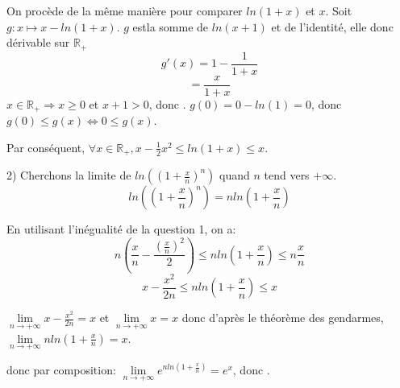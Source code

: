 \documentclass[11pt, letterpaper]{article}
\begin{document}
On procède de la même manière pour comparer $ln(1 + x)$ et $x$.
Soit $g : x \mapsto x - ln(1 + x)$.
$g$ estla somme de $ln(x +1)$ et de l'identité, elle donc dérivable sur $\mathbb{R}_{+}$
\[g'(x) = 1 - \frac{1}{1 + x}\]
\[= \frac{x}{1 + x}\]
$ x \in \mathbb{R}_{+} \Rightarrow x \geq 0$ et $x + 1 > 0$, donc .
$g(0)= 0 - ln(1) = 0$, donc $g(0) \leq g(x) \Leftrightarrow 0 \leq g(x)$.

Par conséquent, $\forall x \in \mathbb{R}_{+}, x - \frac{1}{2}x^2 \leq ln(1 + x) \leq x$.

2) Cherchons la limite de $ln((1 + \frac{x}{n})^n)$ quand $n$ tend vers $+ \infty$.
\[ln((1 + \frac{x}{n})^n) = n ln(1 + \frac{x}{n}) \]

En utilisant l'inégualité de la question 1, on a:
\[ n(\frac{x}{n} - \frac{ (\frac{x}{n})^2 }{2}) \leq n ln(1 + \frac{x}{n}) \leq n \frac{x}{n} \]
\[ x - \frac{x^2}{2n} \leq n ln(1 + \frac{x}{n}) \leq x \]

$\lim\limits_{ n \to +\infty} x - \frac{x^2}{2n} = x $ et $ \lim\limits_{ n \to +\infty} x = x$
donc d'après le théorème des gendarmes, $\lim\limits_{ n \to +\infty} n ln(1 + \frac{x}{n}) = x$.

donc par composition: $\lim\limits_{ n \to +\infty} e^{n ln(1 + \frac{x}{n})} = e^x$,
donc .
\end{document}
